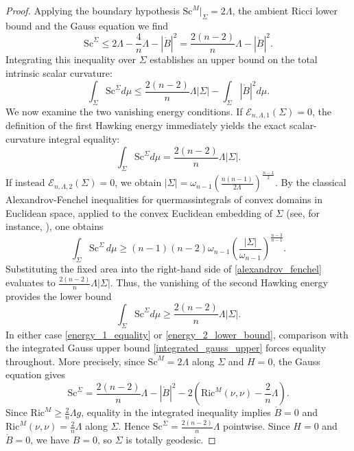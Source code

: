\documentclass[12pt,a4paper]{amsart}
\theoremstyle{plain}
\theoremstyle{definition}
\begin{document}
\begin{proof}
Applying the boundary hypothesis $\mathrm{Sc}^M|_\Sigma = 2\Lambda$, the ambient Ricci lower bound and the Gauss equation we find 
\begin{equation}\label{gauss_upper_bound_minimal}
    \mathrm{Sc}^\Sigma \le 2\Lambda - \frac{4}{n}\Lambda - |\mathring{B}|^2 = \frac{2(n-2)}{n}\Lambda - |\mathring{B}|^2.
\end{equation}
Integrating this inequality over $\Sigma$ establishes an  upper bound on the total intrinsic scalar curvature:
\begin{equation}\label{integrated_gauss_upper}
    \int_\Sigma \mathrm{Sc}^\Sigma d\mu \le \frac{2(n-2)}{n}\Lambda|\Sigma| - \int_\Sigma |\mathring{B}|^2 d\mu.
\end{equation}
We now examine the two vanishing energy conditions. 
If $\mathcal{E}_{n,\Lambda,1}(\Sigma) = 0$, the definition of the first Hawking energy immediately yields the exact scalar-curvature integral equality:
\begin{equation}\label{energy_1_equality}
    \int_\Sigma \mathrm{Sc}^\Sigma d\mu = \frac{2(n-2)}{n}\Lambda|\Sigma|.
\end{equation}
If instead $\mathcal{E}_{n,\Lambda,2}(\Sigma) = 0$, we obtain 
$|\Sigma| = \omega_{n-1} \left( \frac{n(n-1)}{2\Lambda} \right)^{\frac{n-1}{2}}$. By the classical Alexandrov-Fenchel inequalities for quermassintegrals of convex domains in Euclidean space, applied to the convex Euclidean embedding of $\Sigma$ (see, for instance, \cite[Equation (4)]{guan2009quermassintegral}), one obtains
\begin{equation}\label{alexandrov_fenchel}
\int_\Sigma \mathrm{Sc}^{\Sigma}\,d\mu
\ge
(n-1)(n-2)\omega_{n-1}
\left(
\frac{|\Sigma|}{\omega_{n-1}}
\right)^{\frac{n-3}{n-1}}.
\end{equation}  Substituting the fixed area  into the right-hand side of \eqref{alexandrov_fenchel} evaluates to  $\frac{2(n-2)}{n}\Lambda|\Sigma|$. Thus, the vanishing of the second Hawking energy provides the lower bound
\begin{equation}\label{energy_2_lower_bound}
    \int_\Sigma \mathrm{Sc}^\Sigma d\mu \ge \frac{2(n-2)}{n}\Lambda|\Sigma|.
\end{equation}
In either case \eqref{energy_1_equality} or \eqref{energy_2_lower_bound}, comparison with the integrated Gauss upper bound \eqref{integrated_gauss_upper} forces equality throughout. More precisely, since $\mathrm{Sc}^M=2\Lambda$ along $\Sigma$ and $H=0$, the Gauss equation gives
\begin{equation}
\mathrm{Sc}^{\Sigma}
=
\frac{2(n-2)}{n}\Lambda
-
|\mathring B|^2
-
2\left(\mathrm{Ric}^M(\nu,\nu)-\frac{2}{n}\Lambda\right).
\end{equation}
Since $\mathrm{Ric}^M\ge \frac{2}{n}\Lambda g$, equality in the integrated inequality implies $\mathring B=0$ and $\mathrm{Ric}^M(\nu,\nu)=\frac{2}{n}\Lambda$ along $\Sigma$. Hence $\mathrm{Sc}^{\Sigma}=\frac{2(n-2)}{n}\Lambda$ pointwise. Since $H=0$ and $\mathring B=0$, we have $B=0$, so $\Sigma$ is totally geodesic.





\end{proof}
\end{document}
